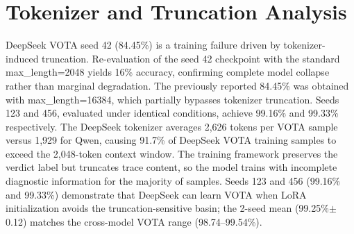 \begin{table}[t]
\centering
\caption{Full results for DeepSeek-Coder-6.7B across all conditions and seeds. \texttt{exception\_only} is consistent across seeds: 99.33/99.50/99.33 ($\sigma{=}$0.10pp).}
\label{tab:full_deepseek}
\small
{}
\end{table}

\section{Tokenizer and Truncation Analysis}
\label{sec:tokenizer_analysis}

DeepSeek VOTA seed 42 (84.45\%) is a training failure driven by tokenizer-induced truncation.
Re-evaluation of the seed 42 checkpoint with the standard max\_length=2048 yields 16\% accuracy, confirming complete model collapse rather than marginal degradation.
The previously reported 84.45\% was obtained with max\_length=16384, which partially bypasses tokenizer truncation.
Seeds 123 and 456, evaluated under identical conditions, achieve 99.16\% and 99.33\% respectively.
The DeepSeek tokenizer averages 2{,}626 tokens per VOTA sample versus 1{,}929 for Qwen, causing 91.7\% of DeepSeek VOTA training samples to exceed the 2{,}048-token context window.
The training framework preserves the verdict label but truncates trace content, so the model trains with incomplete diagnostic information for the majority of samples.
Seeds 123 and 456 (99.16\% and 99.33\%) demonstrate that DeepSeek can learn VOTA when LoRA initialization avoids the truncation-sensitive basin; the 2-seed mean (99.25\%$\pm$0.12) matches the cross-model VOTA range (98.74--99.54\%).


